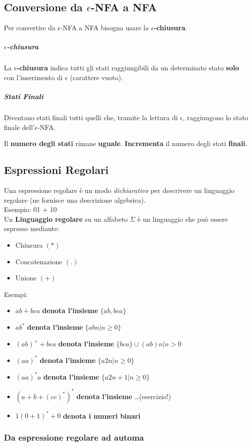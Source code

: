 \documentclass[12pt]{article}
\begin{document}
\subsection{Conversione da $\epsilon$-NFA a NFA}
Per convertire da $\epsilon$-NFA a NFA bisogna usare la $\epsilon$\textbf{-chiusura}.\\
\subparagraph*{$\epsilon$-chiusura}La $\epsilon$\textbf{-chiusura} indica tutti gli stati raggiungibili da un determinato stato \textbf{solo}
con l'inserimento di $\epsilon$ (carattere vuoto). 
\subparagraph*{Stati Finali} Diventano stati finali
tutti quelli che, tramite la lettura di $\epsilon$, raggiungono lo stato finale dell'$\epsilon$-NFA.

Il \textbf{numero degli stati} rimane \textbf{uguale}.
\textbf{Incrementa} il numero degli stati \textbf{finali}.
\subsection{Espressioni Regolari}
Una espressione regolare è un modo \textit{dichiarativo} per descrivere un  linguaggio regolare (ne fornisce una descrizione algebrica).\\
Esempio: 01 + 10\\
Un \textbf{Linguaggio regolare} su un alfabeto $\Sigma$ è un linguaggio che può essere espresso mediante:
\begin{itemize}
    \item Chiusura $(*)$
    \item Concatenazione $(.)$
    \item Unione $(+)$
\end{itemize}
Esempi:
\begin{itemize}
    \item $ab+bca$ \textbf{denota l'insieme} $\{ab, bca\}$  
    \item $ab^*$  \textbf{denota l'insieme} $\{abn | n \ge 0\}$ 
    \item $(ab)^++bca$ \textbf{denota l'insieme} $\{bca\} \cup {(ab)n | n > 0}$  
    \item $(aa)^*$ \textbf{denota l'insieme} $\{a2n |  n \ge 0\}$
    \item $(aa)^*a$ \textbf{denota l'insieme} $\{a2n+1 | n \ge 0\}$
    \item $(a+b+(cc)^*)^*$ \textbf{denota l'insieme} \dots (esercizio!) 
    \item $1(0+1)^*+0$ \textbf{denota i numeri binari}
\end{itemize} 

\subsubsection{Da espressione regolare ad automa}
\end{document}
